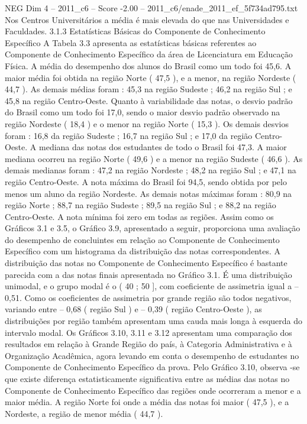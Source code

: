 \begin{textsample}{NEG Dim 4 – 2011\_c6 – Score -2.00 – 2011\_c6/enade\_2011\_ef\_5f734ad795.txt}
Nos Centros Universitários a média é mais elevada do que nas Universidades e Faculdades. 3.1.3 Estatísticas Básicas do Componente de Conhecimento Específico A Tabela 3.3 apresenta as estatísticas básicas referentes ao Componente de Conhecimento Específico da área de Licenciatura em Educação Física.
A média do desempenho dos alunos do Brasil como um todo foi 45,6.
A maior média foi obtida na região Norte ( 47,5 ), e a menor, na região Nordeste ( 44,7 ).
As demais médias foram : 45,3 na região Sudeste ; 46,2 na região Sul ; e 45,8 na região Centro-Oeste.
Quanto à variabilidade das notas, o desvio padrão do Brasil como um todo foi 17,0, sendo o maior desvio padrão observado na região Nordeste ( 18,4 ) e o menor na região Norte ( 15,3 ).
Os demais desvios foram : 16,8 da região Sudeste ; 16,7 na região Sul ; e 17,0 da região Centro-Oeste.
A mediana das notas dos estudantes de todo o Brasil foi 47,3.
A maior mediana ocorreu na região Norte ( 49,6 ) e a menor na região Sudeste ( 46,6 ).
As demais medianas foram : 47,2 na região Nordeste ; 48,2 na região Sul ; e 47,1 na região Centro-Oeste.
A nota máxima do Brasil foi 94,5, sendo obtida por pelo menos um aluno da região Nordeste.
As demais notas máximas foram : 80,9 na região Norte ; 88,7 na região Sudeste ; 89,5 na região Sul ; e 88,2 na região Centro-Oeste.
A nota mínima foi zero em todas as regiões.
Assim como os Gráficos 3.1 e 3.5, o Gráfico 3.9, apresentado a seguir, proporciona uma avaliação do desempenho de concluintes em relação ao Componente de Conhecimento Específico com um histograma da distribuição das notas correspondentes.
A distribuição das notas no Componente de Conhecimento Específico é bastante parecida com a das notas finais apresentada no Gráfico 3.1.
É uma distribuição unimodal, e o grupo modal é o ( 40 ; 50 ], com coeficiente de assimetria igual a – 0,51.
Como os coeficientes de assimetria por grande região são todos negativos, variando entre – 0,68 ( região Sul ) e – 0,39 ( região Centro-Oeste ), as distribuições por região também apresentam uma cauda mais longa à esquerda do intervalo modal.
Os Gráficos 3.10, 3.11 e 3.12 apresentam uma comparação dos resultados em relação à Grande Região do país, à Categoria Administrativa e à Organização Acadêmica, agora levando em conta o desempenho de estudantes no Componente de Conhecimento Específico da prova.
Pelo Gráfico 3.10, observa -se que existe diferença estatisticamente significativa entre as médias das notas no Componente de Conhecimento Específico das regiões onde ocorreram a menor e a maior média.
A região Norte foi onde a média das notas foi maior ( 47,5 ), e a Nordeste, a região de menor média ( 44,7 ).

\end{textsample}
